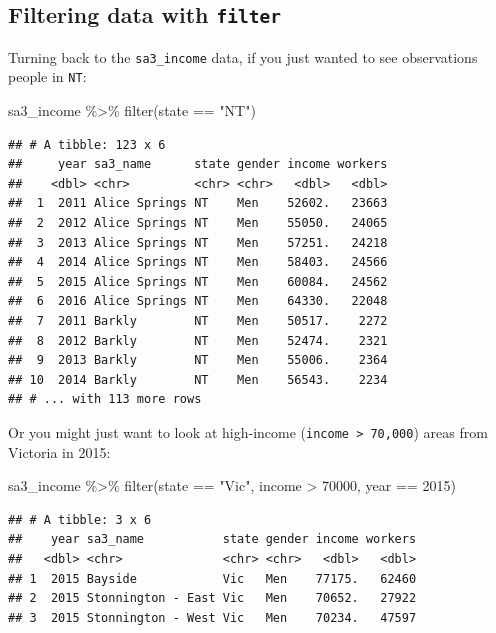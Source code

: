 \documentclass[
]{book}
\newenvironment{Shaded}{\begin{snugshade}}{\end{snugshade}}
\newcommand{\DecValTok}[1]{\textcolor[rgb]{0.00,0.00,0.81}{#1}}
\newcommand{\FunctionTok}[1]{\textcolor[rgb]{0.00,0.00,0.00}{#1}}
\newcommand{\NormalTok}[1]{#1}
\newcommand{\SpecialCharTok}[1]{\textcolor[rgb]{0.00,0.00,0.00}{#1}}
\newcommand{\StringTok}[1]{\textcolor[rgb]{0.31,0.60,0.02}{#1}}
\begin{document}
\hypertarget{filtering-data-with-filter}{%
\subsection{\texorpdfstring{Filtering data with \texttt{filter}}{Filtering data with filter}}\label{filtering-data-with-filter}}

Turning back to the \texttt{sa3\_income} data, if you just wanted to see observations people in \texttt{NT}:

\begin{Shaded}
\begin{Highlighting}[]
\NormalTok{sa3\_income }\SpecialCharTok{\%\textgreater{}\%} 
  \FunctionTok{filter}\NormalTok{(state }\SpecialCharTok{==} \StringTok{"NT"}\NormalTok{)}
\end{Highlighting}
\end{Shaded}

\begin{verbatim}
## # A tibble: 123 x 6
##     year sa3_name      state gender income workers
##    <dbl> <chr>         <chr> <chr>   <dbl>   <dbl>
##  1  2011 Alice Springs NT    Men    52602.   23663
##  2  2012 Alice Springs NT    Men    55050.   24065
##  3  2013 Alice Springs NT    Men    57251.   24218
##  4  2014 Alice Springs NT    Men    58403.   24566
##  5  2015 Alice Springs NT    Men    60084.   24562
##  6  2016 Alice Springs NT    Men    64330.   22048
##  7  2011 Barkly        NT    Men    50517.    2272
##  8  2012 Barkly        NT    Men    52474.    2321
##  9  2013 Barkly        NT    Men    55006.    2364
## 10  2014 Barkly        NT    Men    56543.    2234
## # ... with 113 more rows
\end{verbatim}

Or you might just want to look at high-income (\texttt{income\ \textgreater{}\ 70,000}) areas from Victoria in 2015:

\begin{Shaded}
\begin{Highlighting}[]
\NormalTok{sa3\_income }\SpecialCharTok{\%\textgreater{}\%} 
  \FunctionTok{filter}\NormalTok{(state }\SpecialCharTok{==} \StringTok{"Vic"}\NormalTok{,}
\NormalTok{         income }\SpecialCharTok{\textgreater{}} \DecValTok{70000}\NormalTok{,}
\NormalTok{         year }\SpecialCharTok{==} \DecValTok{2015}\NormalTok{)}
\end{Highlighting}
\end{Shaded}

\begin{verbatim}
## # A tibble: 3 x 6
##    year sa3_name           state gender income workers
##   <dbl> <chr>              <chr> <chr>   <dbl>   <dbl>
## 1  2015 Bayside            Vic   Men    77175.   62460
## 2  2015 Stonnington - East Vic   Men    70652.   27922
## 3  2015 Stonnington - West Vic   Men    70234.   47597
\end{verbatim}
\end{document}
